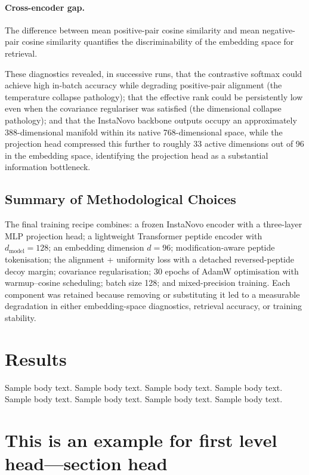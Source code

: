 \documentclass[pdflatex,sn-mathphys-num]{sn-jnl}%
\theoremstyle{thmstyleone}%
\theoremstyle{thmstyletwo}%
\theoremstyle{thmstylethree}%
\begin{document}
\paragraph{Cross-encoder gap.} The difference between mean positive-pair cosine similarity and mean negative-pair cosine similarity quantifies the discriminability of the embedding space for retrieval.

These diagnostics revealed, in successive runs, that the contrastive softmax could achieve high in-batch accuracy while degrading positive-pair alignment (the temperature collapse pathology); that the effective rank could be persistently low even when the covariance regulariser was satisfied (the dimensional collapse pathology); and that the InstaNovo backbone outputs occupy an approximately 388-dimensional manifold within its native 768-dimensional space, while the projection head compressed this further to roughly 33 active dimensions out of 96 in the embedding space, identifying the projection head as a substantial information bottleneck.

\subsection{Summary of Methodological Choices}
\label{subsec:summary}

The final training recipe combines: a frozen InstaNovo encoder with a three-layer MLP projection head; a lightweight Transformer peptide encoder with $d_\text{model}=128$; an embedding dimension $d = 96$; modification-aware peptide tokenisation; the alignment + uniformity loss with a detached reversed-peptide decoy margin; covariance regularisation; 30 epochs of AdamW optimisation with warmup--cosine scheduling; batch size 128; and mixed-precision training. Each component was retained because removing or substituting it led to a measurable degradation in either embedding-space diagnostics, retrieval accuracy, or training stability.

\section{Results}\label{sec2}

Sample body text. Sample body text. Sample body text. Sample body text. Sample body text. Sample body text. Sample body text. Sample body text.

\section{This is an example for first level head---section head}\label{sec3}
\end{document}
